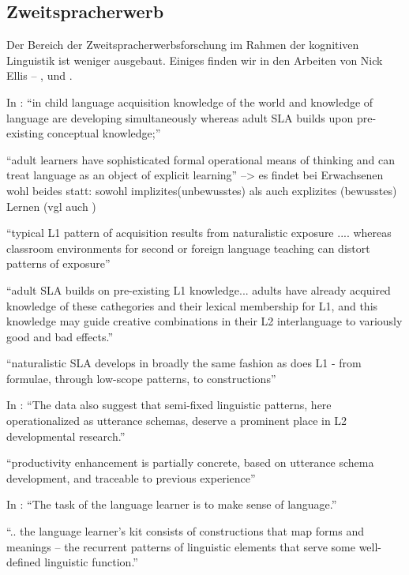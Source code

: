 \subsection{Zweitspracherwerb}
Der Bereich der Zweitspracherwerbsforschung im Rahmen der kognitiven Linguistik ist weniger ausgebaut.
Einiges finden wir in den Arbeiten von Nick Ellis -- \cite{Ellis04}, \cite{Ellis06} und \cite{Ellis08}.

        In \cite{Ellis08}: ``in child language acquisition knowledge of the world and knowledge of language are developing simultaneously whereas adult SLA builds upon pre-existing conceptual knowledge;''

        ``adult learners have sophisticated formal operational means of thinking and can treat language as an object of explicit learning''
        --> es findet bei Erwachsenen wohl beides statt: sowohl implizites(unbewusstes) als auch explizites (bewusstes) Lernen (vgl auch \cite{Ellis04})

        ``typical L1 pattern of acquisition results from naturalistic exposure .... whereas classroom environments for second or foreign language teaching can distort patterns of exposure''

        ``adult SLA builds on pre-existing L1 knowledge... adults have already acquired knowledge of these cathegories and their lexical membership for L1, and this knowledge may guide creative combinations in their L2 interlanguage to variously good and bad effects.''

        ``naturalistic SLA develops in broadly the same fashion as does L1 - from formulae, through low-scope patterns, to constructions''

In \cite{Eskildsen08}: ``The data also suggest that semi-fixed linguistic
patterns, here operationalized as utterance schemas, deserve a prominent place
in L2 developmental research.''

``productivity enhancement is partially concrete, based on utterance schema
development, and traceable to previous experience''

In \cite{Ellis04}: ``The task of the language learner is to make sense of language.''

``.. the language learner's kit consists of constructions that map forms and meanings -- the recurrent patterns of linguistic elements that serve some well-defined linguistic function.''


